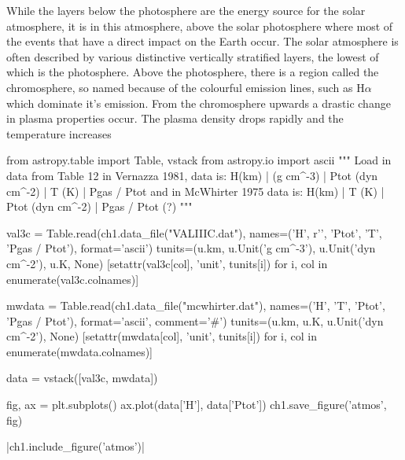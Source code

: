 While the layers below the photosphere are the energy source for the solar atmosphere, it is in this atmosphere, above the solar photosphere where most of the events that have a direct impact on the Earth occur.
The solar atmosphere is often described by various distinctive vertically stratified layers, the lowest of which is the photosphere.
Above the photosphere, there is a region called the chromosphere, so named because of the colourful emission lines, such as H$\alpha$ which dominate it's emission.
From the chromosphere upwards a drastic change in plasma properties occur.
The plasma density drops rapidly and the temperature increases

\begin{pycode}[chapter1]
from astropy.table import Table, vstack
from astropy.io import ascii
"""
Load in data from Table 12 in Vernazza 1981,
data is:
    H(km) | \rho (g cm^-3) | Ptot (dyn cm^-2) | T (K) | Pgas / Ptot
and in McWhirter 1975 data is:  
    H(km) | T (K)          | Ptot (dyn cm^-2) | Pgas / Ptot (?)
"""

val3c = Table.read(ch1.data_file("VALIIIC.dat"),
				  names=('H', r'\rho', 'Ptot', 'T', 'Pgas / Ptot'),
				  format='ascii')
tunits=(u.km, u.Unit('g cm^-3'), u.Unit('dyn cm^-2'), u.K, None)
[setattr(val3c[col], 'unit', tunits[i]) for i, col in enumerate(val3c.colnames)]

mwdata = Table.read(ch1.data_file("mcwhirter.dat"),
				  names=('H', 'T', 'Ptot', 'Pgas / Ptot'),
				  format='ascii', comment='#')
tunits=(u.km, u.K, u.Unit('dyn cm^-2'), None)
[setattr(mwdata[col], 'unit', tunits[i]) for i, col in enumerate(mwdata.colnames)]

data = vstack([val3c, mwdata])

fig, ax = plt.subplots()
ax.plot(data['H'], data['Ptot'])
ch1.save_figure('atmos', fig)
\end{pycode}

\py[chapter1]|ch1.include_figure('atmos')|

